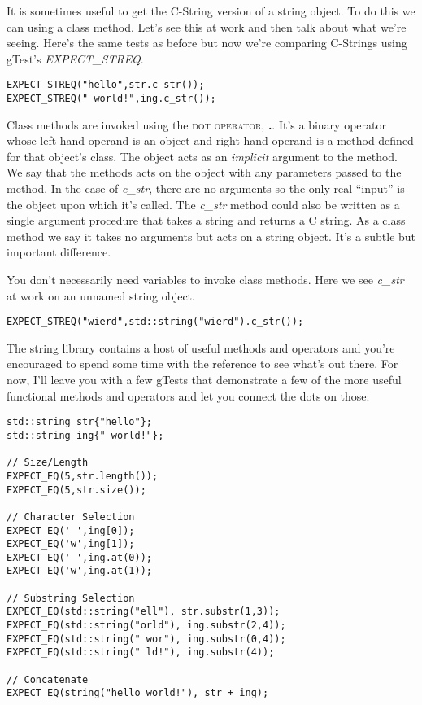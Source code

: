 \documentclass[]{tufte-handout}
\begin{document}
It is sometimes useful to get the C-String version of a string object. To do this we can using a class method. Let's see this at work and then talk about what we're seeing. Here's the same tests as before but now we're comparing C-Strings using gTest's \textit{EXPECT\_STREQ}.
\begin{verbatim}
EXPECT_STREQ("hello",str.c_str());
EXPECT_STREQ(" world!",ing.c_str());
\end{verbatim}
Class methods are invoked using the \textsc{dot operator}, \textbf{.}.  It's a binary operator whose left-hand operand is an object and right-hand operand is a method defined for that object's class. The object acts as an \textit{implicit} argument to the method. We say that the methods acts on the object with any parameters passed to the method. In the case of \textit{c\_str}, there are no arguments so the only real ``input'' is the object upon which it's called.  The \textit{c\_str} method could also be written as a single argument procedure that takes a string and returns a C string. As a class method we say it takes no arguments but acts on a string object. It's a subtle but important difference. 

You don't necessarily need variables to invoke class methods.  Here we see \textit{c\_str} at work on an unnamed string object.
\begin{verbatim}
EXPECT_STREQ("wierd",std::string("wierd").c_str());
\end{verbatim}

The string library contains a host of useful methods and operators and you're encouraged to spend some time with the reference to see what's out there. For now, I'll leave you with a few gTests that demonstrate a few of the more useful functional methods and operators and let you connect the dots on those:
\begin{verbatim}
std::string str{"hello"};
std::string ing{" world!"};

// Size/Length
EXPECT_EQ(5,str.length());
EXPECT_EQ(5,str.size());

// Character Selection
EXPECT_EQ(' ',ing[0]);
EXPECT_EQ('w',ing[1]);
EXPECT_EQ(' ',ing.at(0));
EXPECT_EQ('w',ing.at(1));

// Substring Selection
EXPECT_EQ(std::string("ell"), str.substr(1,3));
EXPECT_EQ(std::string("orld"), ing.substr(2,4));
EXPECT_EQ(std::string(" wor"), ing.substr(0,4));
EXPECT_EQ(std::string(" ld!"), ing.substr(4));

// Concatenate 
EXPECT_EQ(string("hello world!"), str + ing);
\end{verbatim} 
\end{document}
